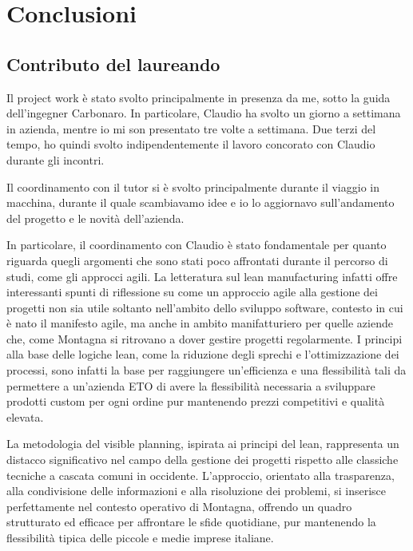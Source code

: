 \chapter{Conclusioni}

    \section{Contributo del laureando}
\begin{multicols}{2}
Il project work è stato svolto principalmente in presenza da me, sotto la guida dell'ingegner Carbonaro. In particolare, Claudio ha svolto un giorno a settimana in azienda, mentre io mi son presentato tre volte a settimana. Due terzi del tempo, ho quindi svolto indipendentemente il lavoro concorato con Claudio durante gli incontri. 

Il coordinamento con il tutor si è svolto principalmente durante il viaggio in macchina, durante il quale scambiavamo idee e io lo aggiornavo sull'andamento del progetto e le novità dell'azienda. 

	In particolare, il coordinamento con Claudio è stato fondamentale per quanto riguarda quegli argomenti che sono stati poco affrontati durante il percorso di studi, come gli approcci agili.
    La letteratura sul lean manufacturing infatti offre interessanti spunti di riflessione su come un approccio agile alla gestione dei progetti non sia utile soltanto nell'ambito dello sviluppo software, contesto in cui è nato il manifesto agile, ma anche in ambito manifatturiero per quelle aziende che, come Montagna si ritrovano a dover gestire progetti regolarmente.
    I principi alla base delle logiche lean, come la riduzione degli sprechi e l'ottimizzazione dei processi, sono infatti la base per raggiungere un'efficienza e una flessibilità tali da permettere a un'azienda ETO di avere la flessibilità necessaria a sviluppare prodotti custom per ogni ordine pur mantenendo prezzi competitivi e qualità elevata.

	La metodologia del visible planning, ispirata ai principi del lean, rappresenta un distacco significativo nel campo della gestione dei progetti rispetto alle classiche tecniche a cascata comuni in occidente.
    L'approccio, orientato alla trasparenza, alla condivisione delle informazioni e alla risoluzione dei problemi, si inserisce perfettamente nel contesto operativo di Montagna, offrendo un quadro strutturato ed efficace per affrontare le sfide quotidiane, pur mantenendo la flessibilità tipica delle piccole e medie imprese italiane.


\end{multicols}
